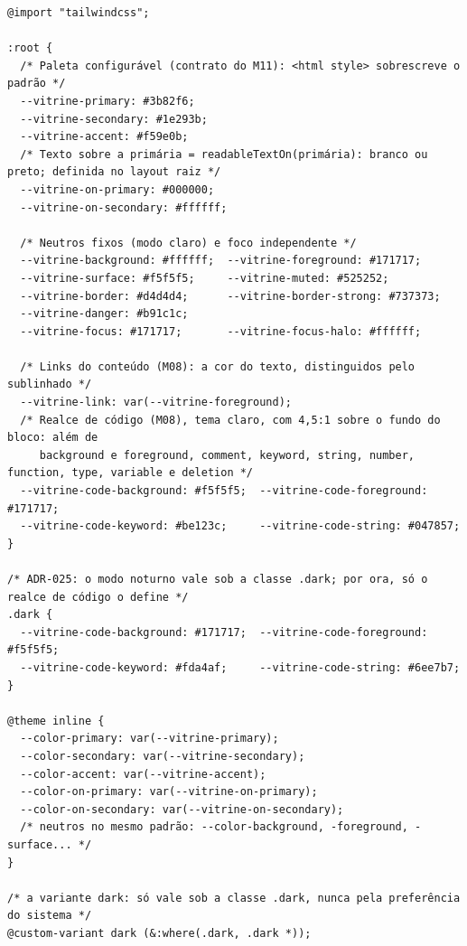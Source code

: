 \begin{lstlisting}[language=VCSS, caption={Tokens de tema em globals.css (resumo; merges M-005 e M-009)}, label={lst:tema-css}]
@import "tailwindcss";

:root {
  /* Paleta configurável (contrato do M11): <html style> sobrescreve o padrão */
  --vitrine-primary: #3b82f6;
  --vitrine-secondary: #1e293b;
  --vitrine-accent: #f59e0b;
  /* Texto sobre a primária = readableTextOn(primária): branco ou preto; definida no layout raiz */
  --vitrine-on-primary: #000000;
  --vitrine-on-secondary: #ffffff;

  /* Neutros fixos (modo claro) e foco independente */
  --vitrine-background: #ffffff;  --vitrine-foreground: #171717;
  --vitrine-surface: #f5f5f5;     --vitrine-muted: #525252;
  --vitrine-border: #d4d4d4;      --vitrine-border-strong: #737373;
  --vitrine-danger: #b91c1c;
  --vitrine-focus: #171717;       --vitrine-focus-halo: #ffffff;

  /* Links do conteúdo (M08): a cor do texto, distinguidos pelo sublinhado */
  --vitrine-link: var(--vitrine-foreground);
  /* Realce de código (M08), tema claro, com 4,5:1 sobre o fundo do bloco: além de
     background e foreground, comment, keyword, string, number, function, type, variable e deletion */
  --vitrine-code-background: #f5f5f5;  --vitrine-code-foreground: #171717;
  --vitrine-code-keyword: #be123c;     --vitrine-code-string: #047857;
}

/* ADR-025: o modo noturno vale sob a classe .dark; por ora, só o realce de código o define */
.dark {
  --vitrine-code-background: #171717;  --vitrine-code-foreground: #f5f5f5;
  --vitrine-code-keyword: #fda4af;     --vitrine-code-string: #6ee7b7;
}

@theme inline {
  --color-primary: var(--vitrine-primary);
  --color-secondary: var(--vitrine-secondary);
  --color-accent: var(--vitrine-accent);
  --color-on-primary: var(--vitrine-on-primary);
  --color-on-secondary: var(--vitrine-on-secondary);
  /* neutros no mesmo padrão: --color-background, -foreground, -surface... */
}

/* a variante dark: só vale sob a classe .dark, nunca pela preferência do sistema */
@custom-variant dark (&:where(.dark, .dark *));
\end{lstlisting}

